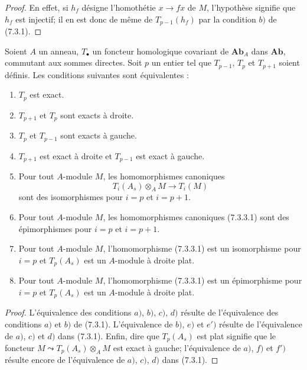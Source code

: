 \begin{proof}
En effet, si $h_f$ désigne l'homothétie $x\to fx$ de $M$, l'hypothèse
signifie que $h_f$ est injectif; il en est donc de même de $T_{p-1}(h_f)$ par
la condition $b)$ de (7.3.1).
\end{proof}

\begin{proposition}[7.3.3]
Soient $A$ un anneau, $T_\bullet$ un foncteur homologique covariant de
$\boldsymbol{Ab}_A$ dans $\boldsymbol{Ab}$, commutant aux sommes directes. Soit $p$ un
entier tel que $T_{p-1}$, $T_p$ et $T_{p+1}$ soient définis. Les conditions
suivantes sont équivalentes :
\begin{enumerate}
  \item[a)] $T_p$ est exact.
  \item[b)] $T_{p+1}$ et $T_p$ sont exacts à droite.
  \item[c)] $T_p$ et $T_{p-1}$ sont exacts à gauche.
  \item[d)] $T_{p+1}$ est exact à droite et $T_{p-1}$ est exact à gauche.
  \item[e)] Pour tout $A$-module $M$, les homomorphismes canoniques
    \[
      T_i(A_s)\otimes_A M\longrightarrow T_i(M)
      \tag{7.3.3.1}\label{III.7.3.3.1.fr}
    \]
    sont des isomorphismes pour $i=p$ et $i=p+1$.
  \item[$e'$)] Pour tout $A$-module $M$, les homomorphismes canoniques
    \textup{(7.3.3.1)} sont des épimorphismes pour $i=p$ et $i=p+1$.
  \item[f)] Pour tout $A$-module $M$, l'homomorphisme \textup{(7.3.3.1)} est un
    isomorphisme pour $i=p$ et $T_p(A_s)$ est un $A$-module à droite plat.
  \item[$f'$)] Pour tout $A$-module $M$, l'homomorphisme \textup{(7.3.3.1)} est un
    épimorphisme pour $i=p$ et $T_p(A_s)$ est un $A$-module à droite plat.
\end{enumerate}
\end{proposition}

\begin{proof}
L'équivalence des conditions $a)$, $b)$, $c)$, $d)$ résulte de l'équivalence
des conditions $a)$ et $b)$ de (7.3.1). L'équivalence de $b)$, $e)$ et $e')$
résulte de l'équivalence de $a)$, $c)$ et $d)$ dans (7.3.1). Enfin, dire que
$T_p(A_s)$ est plat signifie que le foncteur
$M\leadsto T_p(A_s)\otimes_A M$
est exact à gauche; l'équivalence de $a)$, $f)$ et $f')$ résulte encore de
l'équivalence de $a)$, $c)$, $d)$ dans (7.3.1).
\end{proof}

